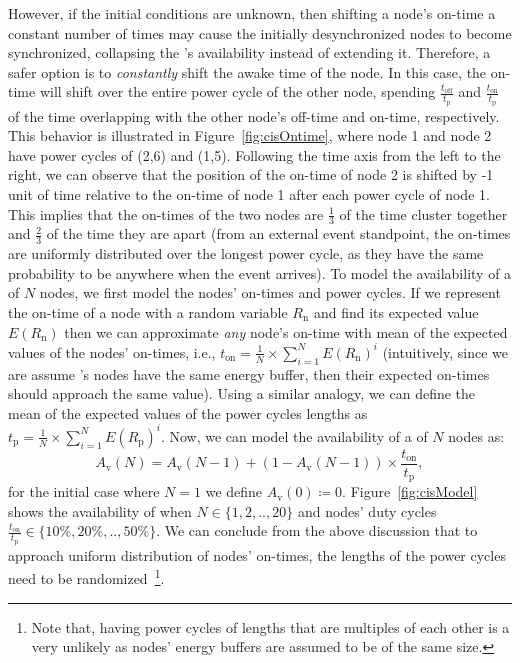However, if the initial conditions are unknown, then shifting a node's on-time a constant number of times may cause the initially desynchronized nodes to become synchronized, collapsing the \cis's availability instead of extending it. Therefore, a safer option is to \emph{constantly} shift the awake time of the node. In this case, the on-time will shift over the entire power cycle of the other node, spending $\frac{ t_\text{off} }{t_\text{p}}$ and $\frac{ t_\text{on} }{t_\text{p}}$ of the time overlapping with the other node's off-time and on-time, respectively. This behavior is illustrated in Figure~\ref{fig:cisOntime}, where node 1 and node 2 have power cycles of (2,6) and (1,5). Following the time axis from the left to the right, we can observe that the position of the on-time of node 2 is shifted by -1 unit of time relative to the on-time of node 1 after each power cycle of node 1. This implies that the on-times of the two nodes are $\frac{1}{3}$ of the time cluster together and $\frac{2}{3}$ of the time they are apart (from an external event standpoint, the on-times are uniformly distributed over the longest power cycle, as they have the same probability to be anywhere when the event arrives). To model the availability of a \cis of $N$ nodes, we first model the nodes' on-times and power cycles.
%
If we represent the on-time of a node with a random variable $R_\text{n}$ and find its expected value $E(R_\text{n})$ then we can approximate \emph{any} \cis node's on-time with mean of the expected values of the nodes' on-times, i.e., $t_\text{on} = \frac{1}{N} \times \sum_{i=1}^{N} E(R_\text{n})^i$ (intuitively, since we are assume \cis's nodes have the same energy buffer, then their expected on-times should approach the same value). Using a similar analogy, we can define the mean of the expected values of the power cycles lengths as $t_\text{p} = \frac{1}{N} \times \sum_{i=1}^{N} E(R_\text{p})^i$. Now, we can model the availability of a \cis of $N$ nodes as:
%
%	
\begin{equation}
	A_\text{v}(N) = A_\text{v}(N-1) + \left(1-A_\text{v}(N-1)\right) \times \frac{t_\text{on}}{t_\text{p}},
		\label{eq:cisModel}
\end{equation}
%
for the initial case where $N=1$ we define $A_\text{v}(0)\coloneqq 0$. Figure~\ref{fig:cisModel} shows the availability of \cis when $N\in\{1,2,..,20\}$ and nodes' duty cycles $\frac{t_\text{on}}{t_\text{p}}\in\{10\%,20\%,..,50\%\}$.
%
We can conclude from the above discussion that to approach uniform distribution of nodes' on-times, the lengths of the power cycles need to be randomized~\footnote{Note that, having power cycles of lengths that are multiples of each other is a very unlikely as nodes' energy buffers are assumed to be of the same size.}. 

